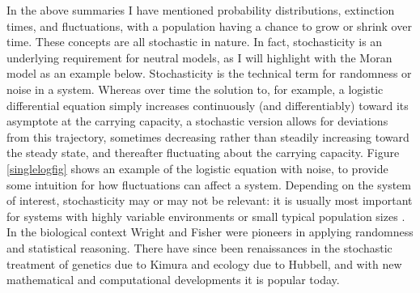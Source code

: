 In the above summaries I have mentioned probability distributions, extinction times, and fluctuations, with a population having a chance to grow or shrink over time. 
These concepts are all stochastic in nature. 
In fact, stochasticity is an underlying requirement for neutral models, as I will highlight with the Moran model as an example below. 
Stochasticity is the technical term for randomness or noise in a system. %
Whereas over time the solution to, for example, a logistic differential equation simply increases continuously (and differentiably) toward its asymptote at the carrying capacity, a stochastic version allows for deviations from this trajectory, sometimes decreasing rather than steadily increasing toward the steady state, and thereafter fluctuating about the carrying capacity. 
Figure \ref{singlelogfig} shows an example of the logistic equation with noise, to provide some intuition for how fluctuations can affect a system. 
Depending on the system of interest, stochasticity may or may not be relevant: it is usually most important for systems with highly variable environments or small typical population sizes \cite{Nisbet1982,Kimura1983,VanKampen1992,Gardiner2004a,Blythe2007,Ovaskainen2010,Black2012}. 
In the biological context Wright and Fisher were pioneers in applying randomness and statistical reasoning. %
There have since been renaissances in the stochastic treatment of genetics due to Kimura and ecology due to Hubbell, and with new mathematical and computational developments it is popular today. %

